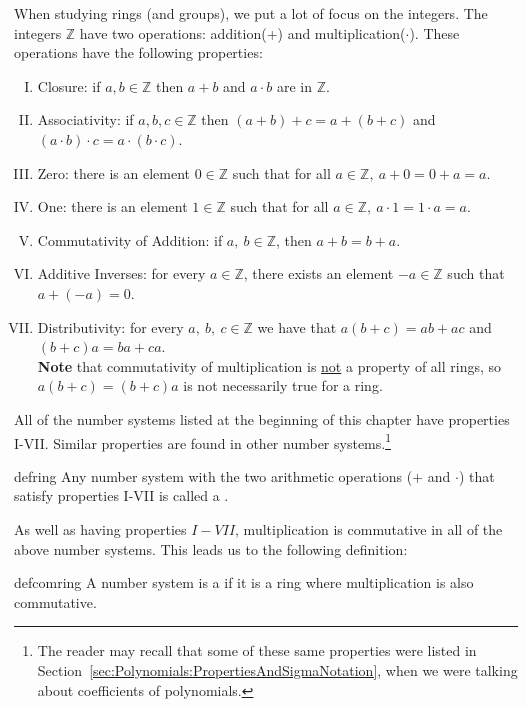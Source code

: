 When studying rings (and groups), we put a lot of focus on the integers.  The integers ${\mathbb Z}$ have two operations: addition(+) and multiplication($\cdot$). These operations have the following properties:
\begin{enumerate}[(I)]
\item Closure: if $a, b \in {\mathbb Z}$ then $a+b$ and $a\cdot b$ are in ${\mathbb Z}$.
\item Associativity: if $a, b, c\in {\mathbb Z}$ then $(a+b)+c=a+(b+c)$ and $(a\cdot b)\cdot c=a\cdot (b\cdot c)$.
\item Zero: there is an element $0\in {\mathbb Z}$ such that for all $a\in {\mathbb Z},~a+0=0+a=a$.
\item One: there is an element $1\in {\mathbb Z}$ such that for all $a\in {\mathbb Z},~a\cdot 1=1\cdot a=a$.
\item Commutativity of Addition: if $a,~b\in {\mathbb Z}$, then $a+b=b+a$. 
\item Additive Inverses: for every $a\in {\mathbb Z}$, there exists an element $-a\in {\mathbb Z}$ such that $a+(-a)=0$.
\item Distributivity: for every $a,~b,~c\in {\mathbb Z}$ we have that $a(b+c)=ab+ac$ and $(b+c)a=ba+ca$.\\

\textbf{Note} that commutativity of multiplication is \underline{not} a property of all  rings, so $a(b+c)=(b+c)a$ is not necessarily true for a ring.
 \end{enumerate}

All of the number systems listed at the beginning of this chapter have properties I-VII.  Similar properties are found in other number systems.\footnote{The reader may recall that some of these same properties were listed in Section~\ref{sec:Polynomials:PropertiesAndSigmaNotation}, when we were talking about coefficients of polynomials.}

\begin{defn}{defring}
Any number system with the two arithmetic operations (+ and $\cdot$) that satisfy properties I-VII is called a .
\end{defn}

As well as having properties $I-VII$, multiplication is commutative in all of the above number systems. This leads us to the following definition:

\begin{defn}{defcomring}
A number system is a  if it is a ring where multiplication is also commutative.
\end{defn}


